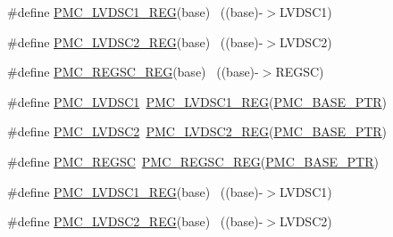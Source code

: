 \begin{DoxyCompactItemize}
\item 
\#define \hyperlink{group___p_m_c___register___accessor___macros_ga2fe280fb8b910471c6a1308e8507dd25}{P\+M\+C\+\_\+\+L\+V\+D\+S\+C1\+\_\+\+R\+EG}(base)                                      ~((base)-\/$>$L\+V\+D\+S\+C1)
\item 
\#define \hyperlink{group___p_m_c___register___accessor___macros_ga4df6ab8710ac0dd4d7dd3a316de354c8}{P\+M\+C\+\_\+\+L\+V\+D\+S\+C2\+\_\+\+R\+EG}(base)                                      ~((base)-\/$>$L\+V\+D\+S\+C2)
\item 
\#define \hyperlink{group___p_m_c___register___accessor___macros_gababe9178e390666706c6a7f23b1dccb2}{P\+M\+C\+\_\+\+R\+E\+G\+S\+C\+\_\+\+R\+EG}(base)                                        ~((base)-\/$>$R\+E\+G\+SC)
\item 
\#define \hyperlink{group___p_m_c___register___accessor___macros_gae9e90b7b2d3c4f5e0950d074fecb2798}{P\+M\+C\+\_\+\+L\+V\+D\+S\+C1}~\hyperlink{group___p_m_c___register___accessor___macros_ga2fe280fb8b910471c6a1308e8507dd25}{P\+M\+C\+\_\+\+L\+V\+D\+S\+C1\+\_\+\+R\+EG}(\hyperlink{group___p_m_c___peripheral_gaf32df9f1096263f10a5e8978a338b2ac}{P\+M\+C\+\_\+\+B\+A\+S\+E\+\_\+\+P\+TR})
\item 
\#define \hyperlink{group___p_m_c___register___accessor___macros_ga921b48d20e5bc7e7353ac2f59c8135ba}{P\+M\+C\+\_\+\+L\+V\+D\+S\+C2}~\hyperlink{group___p_m_c___register___accessor___macros_ga4df6ab8710ac0dd4d7dd3a316de354c8}{P\+M\+C\+\_\+\+L\+V\+D\+S\+C2\+\_\+\+R\+EG}(\hyperlink{group___p_m_c___peripheral_gaf32df9f1096263f10a5e8978a338b2ac}{P\+M\+C\+\_\+\+B\+A\+S\+E\+\_\+\+P\+TR})
\item 
\#define \hyperlink{group___p_m_c___register___accessor___macros_gad80edb8f69da1769b7367108d8c4f9be}{P\+M\+C\+\_\+\+R\+E\+G\+SC}~\hyperlink{group___p_m_c___register___accessor___macros_gababe9178e390666706c6a7f23b1dccb2}{P\+M\+C\+\_\+\+R\+E\+G\+S\+C\+\_\+\+R\+EG}(\hyperlink{group___p_m_c___peripheral_gaf32df9f1096263f10a5e8978a338b2ac}{P\+M\+C\+\_\+\+B\+A\+S\+E\+\_\+\+P\+TR})
\item 
\#define \hyperlink{group___p_m_c___register___accessor___macros_ga2fe280fb8b910471c6a1308e8507dd25}{P\+M\+C\+\_\+\+L\+V\+D\+S\+C1\+\_\+\+R\+EG}(base)                                      ~((base)-\/$>$L\+V\+D\+S\+C1)
\item 
\#define \hyperlink{group___p_m_c___register___accessor___macros_ga4df6ab8710ac0dd4d7dd3a316de354c8}{P\+M\+C\+\_\+\+L\+V\+D\+S\+C2\+\_\+\+R\+EG}(base)                                      ~((base)-\/$>$L\+V\+D\+S\+C2)

\end{DoxyCompactItemize}
